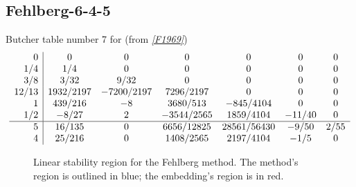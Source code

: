 \documentclass[letterpaper,10pt,english]{sphinxmanual}
\begin{document}
\subsection{Fehlberg-6-4-5}
\label{Butcher:butcher-fehlberg}\label{Butcher:fehlberg-6-4-5}
Butcher table number 7
for {\hyperref[c_interface/User_callable:c.ARKodeSetERKTableNum]{\emph{}}} (from \label{Butcher:id7}{\hyperref[References:f1969]{\emph{{[}F1969{]}}}})
\begin{gather}
\begin{split}\begin{array}{r|cccccc}
  0 & 0 & 0 & 0 & 0 & 0 & 0 \\
  1/4 & 1/4 & 0 & 0 & 0 & 0 & 0 \\
  3/8 & 3/32 & 9/32 & 0 & 0 & 0 & 0 \\
  12/13 & 1932/2197 & -7200/2197 & 7296/2197 & 0 & 0 & 0 \\
  1 & 439/216 & -8 & 3680/513 & -845/4104 & 0 & 0 \\
  1/2 & -8/27 & 2 & -3544/2565 & 1859/4104 & -11/40 & 0 \\
  \hline
  5 & 16/135 & 0 & 6656/12825 & 28561/56430 & -9/50 & 2/55 \\
  4 & 25/216 & 0 & 1408/2565 & 2197/4104 & -1/5 & 0
\end{array}\end{split}\notag
\end{gather}\begin{figure}[htbp]
\centering
\capstart

\caption{Linear stability region for the Fehlberg method.  The method's
region is outlined in blue; the embedding's region is in red.}\end{figure}
\end{document}
